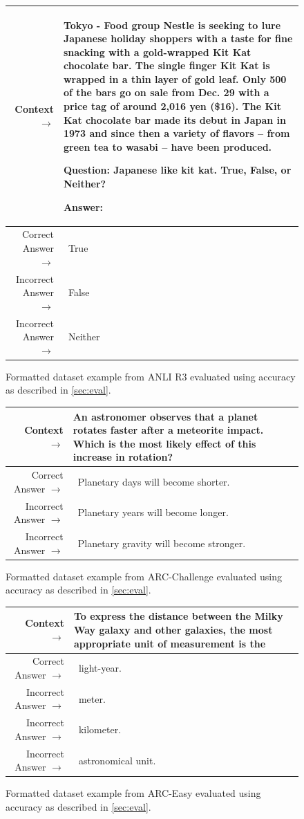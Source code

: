 \documentclass{article}
\begin{document}
 
\begin{figure}[!h] { \tt \footnotesize \begin{tabularx}{\linewidth}{r X} \toprule Context $\to$ & Tokyo - Food group Nestle is seeking to lure Japanese holiday shoppers with a taste for fine snacking with a gold-wrapped Kit Kat chocolate bar. The single finger Kit Kat is wrapped in a thin layer of gold leaf. Only 500 of the bars go on sale from Dec. 29 with a price tag of around 2,016 yen (\$16). The Kit Kat chocolate bar made its debut in Japan in 1973 and since then a variety of flavors -- from green tea to wasabi -- have been produced.

Question: Japanese like kit kat. True, False, or Neither?

Answer:\\
\midrule 
Correct Answer $\to$ & ~True \\ 
Incorrect Answer $\to$ & ~False \\ 
Incorrect Answer $\to$ & ~Neither \\
\bottomrule \end{tabularx} }
\caption{Formatted dataset example from ANLI R3 evaluated using accuracy as described in \autoref{sec:eval}.}  
\label{eval:anlir3}  
\end{figure}
 
\begin{figure}[!h] { \tt \footnotesize \begin{tabularx}{\linewidth}{r X} \toprule Context $\to$ & An astronomer observes that a planet rotates faster after a meteorite impact. Which is the most likely effect of this increase in rotation? \\
\midrule 
Correct Answer $\to$ & ~Planetary days will become shorter. \\ 
Incorrect Answer $\to$ & ~Planetary years will become longer. \\ 
Incorrect Answer $\to$ & ~Planetary gravity will become stronger. \\
\bottomrule \end{tabularx} }
\caption{Formatted dataset example from ARC-Challenge evaluated using accuracy as described in \autoref{sec:eval}.}  
\label{eval:arcc}  
\end{figure}


\begin{figure}[!h] { \tt \footnotesize \begin{tabularx}{\linewidth}{r X} \toprule Context $\to$ & To express the distance between the Milky Way galaxy and other galaxies, the most appropriate unit of measurement is the \\
\midrule 
Correct Answer $\to$ & ~light-year. \\ 
Incorrect Answer $\to$ & ~meter. \\ 
Incorrect Answer $\to$ & ~kilometer. \\
Incorrect Answer $\to$ & ~astronomical unit. \\
\bottomrule \end{tabularx} }
\caption{Formatted dataset example from ARC-Easy evaluated using accuracy as described in \autoref{sec:eval}.}  
\label{eval:arce}  
\end{figure}
\end{document}
